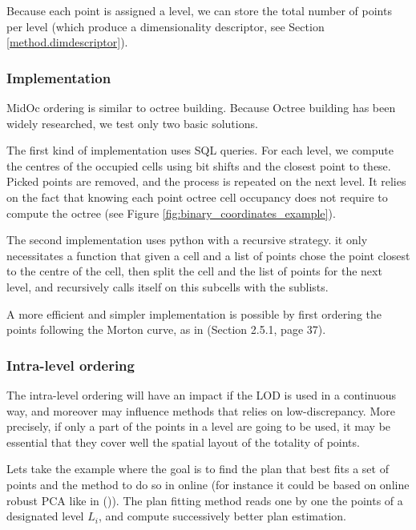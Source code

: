 		Because each point is assigned a level, we can store the total number of points per level (which produce a dimensionality descriptor, see Section \ref{method.dimdescriptor}).
		
		\subsubsection{Implementation}
		\label{method.midoc.implementation}
		MidOc ordering is similar to octree building. Because Octree building has been widely researched, we test only two basic solutions.
		
		The first kind of implementation uses SQL queries. For each level, we compute the centres of the occupied cells using bit shifts and the closest point to these. Picked points are removed, and the process is repeated on the next level.
		It relies on the fact that knowing each point octree cell occupancy does not require to compute the octree (see Figure \ref{fig:binary_coordinates_example}).
		
		The second implementation uses python with a recursive strategy. it only necessitates a function that given a cell and a list of points chose the point closest to the centre of the cell, then split the cell and the list of points for the next level, and recursively calls itself on this subcells with the sublists.
		
		A more efficient and simpler implementation is possible by first ordering the points following the Morton curve, as  in \cite{Feng2014} (Section 2.5.1, page 37). 
		
		\subsubsection{Intra-level ordering}
		\label{method.intralevel}
		
		
		The intra-level ordering will have an impact if the LOD is used in a continuous way,
		and moreover may influence methods that relies on low-discrepancy.
		More precisely, if only a part of the points in a level are going to be used,
		it may be essential that they cover well the spatial layout of the totality of points.
		
		Lets take the example where the goal is to find the plan that best fits a set of points
		and the method to do so in online (for instance it could be based on online robust PCA like in (\cite{Feng2013})).
		The plan fitting method reads one by one the points of a designated level $L_i$, and compute successively better plan estimation.
		
